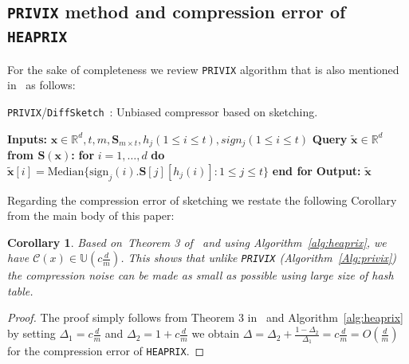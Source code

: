 \documentclass[sigconf, anonymous, review]{acmart}
\newtheorem{corollary}{Corollary}
\begin{document}
\subsection{\texttt{PRIVIX} method and compression error of \texttt{HEAPRIX}}
For the sake of completeness we review \texttt{PRIVIX} algorithm that is also mentioned in~\citep{li2019privacy} as follows:

\begin{algorithm}[H]
\caption{\texttt{PRIVIX}/\texttt{DiffSketch}~\citep{li2019privacy}: Unbiased compressor based on sketching. }\label{Alg:privix}
\begin{algorithmic}[1]
\STATE \textbf{Inputs:} $\boldsymbol{x}\in\mathbb{R}^{d}, t, m, \mathbf{S}_{m\times t}, h_j (1\leq i\leq t), sign_j (1\leq i\leq t)$
\STATE \textbf{Query} $\tilde{\boldsymbol{x}}\in\mathbb{R}^d$ \textbf{from $\mathbf{S(\boldsymbol{x})}$:}
\STATE \textbf{for} $i=1,\ldots,d$ \textbf{do}
\STATE \quad\quad ${\tilde{\boldsymbol{x}}}[i]=\text{Median}\{\text{sign}_j(i).\mathbf{S}[j][h_j(i)]:1\leq j\leq t\}$ 
\STATE \textbf{end for}
\STATE \textbf{Output:} ${\tilde{\boldsymbol{x}}}$
\end{algorithmic}
\end{algorithm}



Regarding the compression error of sketching we restate the following Corollary from the main body of this paper:
\begin{corollary}
Based on~Theorem 3 of~\citep{horvath2020better} and using Algorithm~\ref{alg:heaprix}, we have $\mathcal{C}(x)\in \mathbb{U}(c \frac{d}{m})$. This shows that unlike \texttt{PRIVIX} (Algorithm~\ref{Alg:privix}) the compression noise can be made as small as possible using large size of hash table.
\end{corollary}

\begin{proof}
The proof simply follows from Theorem 3 in~\citep{horvath2020better} and Algorithm~\ref{alg:heaprix} by setting $\Delta_1=c\frac{d}{m}$ and $\Delta_2=1+c\frac{d}{m}$ we obtain $\Delta=\Delta_2+\frac{1-\Delta_2}{\Delta_1}=c\frac{d}{m}=O\left(\frac{d}{m}\right)$ for the compression error of \texttt{HEAPRIX}. 
\end{proof}

\clearpage
\end{document}
